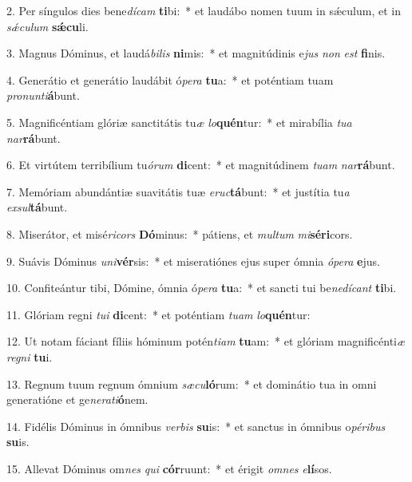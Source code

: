 2. Per síngulos dies bene\textit{dí}\textit{cam} \textbf{ti}bi:~*  et laudábo nomen tuum in sǽculum, et in \textit{sǽ}\textit{cu}\textit{lum} \textbf{sǽ}\textbf{cu}li.\

3. Magnus Dóminus, et laudá\textit{bi}\textit{lis} \textbf{ni}mis:~*  et magnitúdinis e\textit{jus} \textit{non} \textit{est} \textbf{fi}nis.\

4. Generátio et generátio laudábit ó\textit{pe}\textit{ra} \textbf{tu}a:~*  et poténtiam tuam \textit{pro}\textit{nun}\textit{ti}\textbf{á}bunt.\

5. Magnificéntiam glóriæ sanctitátis tu\textit{æ} \textit{lo}\textbf{quén}tur:~*  et mirabília \textit{tu}\textit{a} \textit{nar}\textbf{rá}bunt.\

6. Et virtútem terribílium tu\textit{ó}\textit{rum} \textbf{di}cent:~*  et magnitúdinem \textit{tu}\textit{am} \textit{nar}\textbf{rá}bunt.\

7. Memóriam abundántiæ suavitátis tuæ \textit{e}\textit{ruc}\textbf{tá}bunt:~*  et justítia tu\textit{a} \textit{ex}\textit{sul}\textbf{tá}bunt.\

8. Miserátor, et misé\textit{ri}\textit{cors} \textbf{Dó}minus:~*  pátiens, et \textit{mul}\textit{tum} \textit{mi}\textbf{sé}\textbf{ri}cors.\

9. Suávis Dóminus \textit{u}\textit{ni}\textbf{vér}sis:~*  et miseratiónes ejus super ómnia \textit{ó}\textit{pe}\textit{ra} \textbf{e}jus.\

10. Confiteántur tibi, Dómine, ómnia ó\textit{pe}\textit{ra} \textbf{tu}a:~*  et sancti tui be\textit{ne}\textit{dí}\textit{cant} \textbf{ti}bi.\

11. Glóriam regni \textit{tu}\textit{i} \textbf{di}cent:~*  et poténtiam \textit{tu}\textit{am} \textit{lo}\textbf{quén}tur:\

12. Ut notam fáciant fíliis hóminum potén\textit{ti}\textit{am} \textbf{tu}am:~*  et glóriam magnificénti\textit{æ} \textit{re}\textit{gni} \textbf{tu}i.\

13. Regnum tuum regnum ómnium \textit{sæ}\textit{cu}\textbf{ló}rum:~*  et dominátio tua in omni generatióne et ge\textit{ne}\textit{ra}\textit{ti}\textbf{ó}nem.\

14. Fidélis Dóminus in ómnibus \textit{ver}\textit{bis} \textbf{su}is:~*  et sanctus in ómnibus o\textit{pé}\textit{ri}\textit{bus} \textbf{su}is.\

15. Allevat Dóminus om\textit{nes} \textit{qui} \textbf{cór}ruunt:~*  et érigit \textit{om}\textit{nes} \textit{e}\textbf{lí}sos.\

